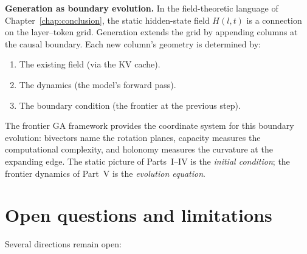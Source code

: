 \documentclass[11pt, twoside, openright]{memoir}
\numberwithin{equation}{chapter}
\begin{document}
\begin{gabox}
\textbf{Generation as boundary evolution.}
In the field-theoretic language of
Chapter~\ref{chap:conclusion}, the static hidden-state field
$H(l, t)$ is a connection on the layer--token grid.  Generation
extends the grid by appending columns at the causal boundary.
Each new column's geometry is determined by:
\begin{enumerate}[nosep]
\item The existing field (via the KV cache).
\item The dynamics (the model's forward pass).
\item The boundary condition (the frontier at the previous step).
\end{enumerate}

The frontier GA framework provides the coordinate system for this
boundary evolution: bivectors name the rotation planes, capacity
measures the computational complexity, and holonomy measures the
curvature at the expanding edge.
The static picture of Parts~I--IV is the \emph{initial condition};
the frontier dynamics of Part~V is the \emph{evolution equation}.
\end{gabox}


\section{Open questions and limitations}
\label{sec:pred-open}

Several directions remain open:
\end{document}
